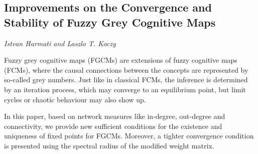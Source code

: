 \documentclass[../booklet.tex]{subfiles}
\begin{document}
\subsection[Improvements on the Convergence and Stability of Fuzzy Grey Cognitive Maps. {\it Istvan Harmati and Laszlo T. Koczy}]{Improvements on the Convergence and Stability of Fuzzy Grey Cognitive Maps}
 

\begin{center}
  {\it Istvan Harmati and Laszlo T. Koczy}
\end{center}

\vskip 0.8cm


Fuzzy grey cognitive maps (FGCMs) are extensions of fuzzy cognitive maps (FCMs), where the causal connections between the concepts are represented by so-called grey numbers.  Just like in classical FCMs, the inference is determined by an iteration process, which may converge to an equilibrium point, but limit cycles or chaotic behaviour may also show up.

In this paper, based on network measures like in-degree, out-degree and connectivity, we provide new sufficient conditions for the existence and uniqueness of fixed points for FGCMs. Moreover, a tighter convergence condition is presented using the spectral radius of the modified weight matrix.

\end{document}
